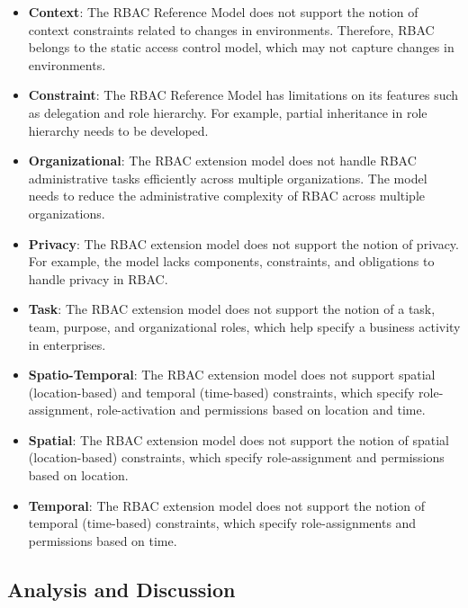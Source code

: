 \begin{itemize}

  \item \textbf{Context}: The RBAC Reference Model does not support the notion of context constraints  related to changes in environments. Therefore, RBAC belongs to the static access control model, which may not capture changes in environments.
 
  \item \textbf{Constraint}: The RBAC Reference Model has limitations on its features such as delegation and role hierarchy. For example, partial inheritance in role hierarchy needs to be developed.
  
  \item \textbf{Organizational}: The RBAC extension model does not handle RBAC administrative tasks efficiently across multiple organizations. The model needs to reduce the administrative complexity of RBAC across multiple organizations.
   
  \item \textbf{Privacy}: The RBAC extension model does not support the notion of privacy. For example, the model lacks components, constraints, and obligations to handle privacy in RBAC.
  
  \item \textbf{Task}: The RBAC extension model does not support the notion of a task, team, purpose, and organizational roles, which help specify a business activity in enterprises.
    
  \item \textbf{Spatio-Temporal}: The RBAC extension model does not support spatial (location-based) and temporal (time-based) constraints, which specify role-assignment, role-activation and permissions based on location and time.
  
  \item \textbf{Spatial}: The RBAC extension model does not support the notion of spatial (location-based)  constraints, which specify role-assignment and permissions based on location.
        
  \item \textbf{Temporal}: The RBAC extension model does not support the notion of temporal (time-based)  constraints, which specify role-assignments and permissions based on time.
      
	
\end{itemize}
 

\subsection{Analysis and Discussion}

